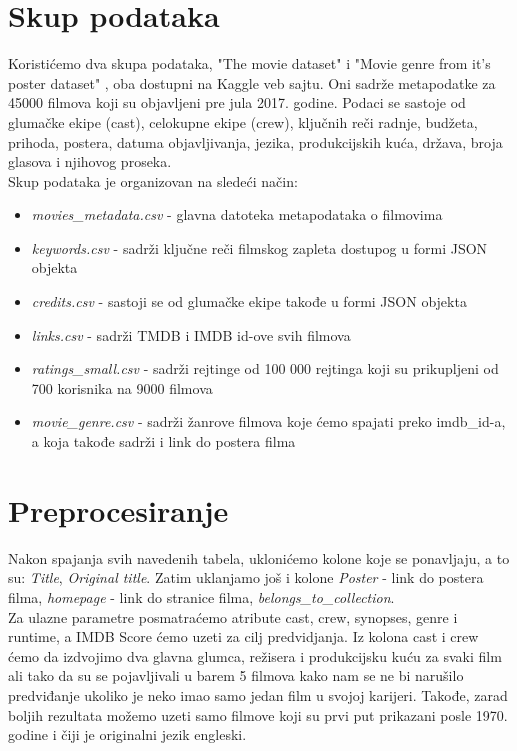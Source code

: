 \documentclass[a4paper]{article}
\begin{document}
\section{Skup podataka}
\label{sec:skupPodataka}
Koristićemo dva skupa podataka, "The movie dataset" \cite{movieDataset} i "Movie genre from it's poster dataset" \cite{movieGenres}, oba dostupni na Kaggle \cite{kaggle} veb sajtu. Oni sadrže metapodatke za 45000 filmova koji su objavljeni pre jula 2017. godine. Podaci se sastoje od glumačke ekipe (cast), celokupne ekipe (crew), ključnih reči radnje, budžeta, prihoda, postera, datuma objavljivanja, jezika, produkcijskih kuća, država, broja glasova i njihovog proseka.\\

Skup podataka je organizovan na sledeći način:
\begin{itemize}
	\item \textit{movies\_metadata.csv} - glavna datoteka metapodataka o filmovima
	\item \textit{keywords.csv} - sadrži ključne reči filmskog zapleta dostupog u formi JSON objekta
	\item \textit{credits.csv} - sastoji se od glumačke ekipe takođe u formi JSON objekta
	\item \textit{links.csv} - sadrži TMDB i IMDB id-ove svih filmova
	\item \textit{ratings\_small.csv} - sadrži rejtinge od 100 000 rejtinga koji su prikupljeni od 700 korisnika na 9000 filmova
	\item \textit{movie\_genre.csv} - sadrži žanrove filmova koje ćemo spajati preko imdb\_id-a, a koja takođe sadrži i link do postera filma
\end{itemize}


\section{Preprocesiranje}
\label{sec:preprocesiranje}

Nakon spajanja svih navedenih tabela, uklonićemo kolone koje se ponavljaju, a to su: \textit{Title}, \textit{Original title}. Zatim uklanjamo još i kolone \textit{Poster} - link do postera filma, \textit{homepage} - link do stranice filma, \textit{belongs\_to\_collection}.\\

Za ulazne parametre posmatraćemo atribute cast, crew, synopses, genre i runtime, a IMDB Score ćemo uzeti za cilj predvidjanja. Iz kolona cast i crew ćemo da izdvojimo dva glavna glumca, režisera i produkcijsku kuću za svaki film ali tako da su se pojavljivali u barem 5 filmova kako nam se ne bi narušilo predviđanje ukoliko je neko imao samo jedan film u svojoj karijeri. Takođe, zarad boljih rezultata možemo uzeti samo filmove koji su prvi put prikazani posle 1970. godine i čiji je originalni jezik engleski.\\
\end{document}
